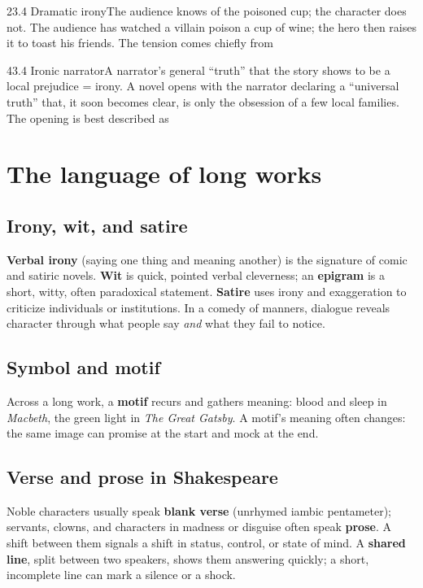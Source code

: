 \documentclass[11pt]{article}
\begin{document}
\begin{q}{2}{3.4 Dramatic irony}{The audience knows of the poisoned cup; the character does not.}
The audience has watched a villain poison a cup of wine; the hero then raises it to toast his friends. The tension comes chiefly from
\end{q}

\begin{q}{4}{3.4 Ironic narrator}{A narrator's general ``truth'' that the story shows to be a local prejudice = irony.}
A novel opens with the narrator declaring a ``universal truth'' that, it soon becomes clear, is only the obsession of a few local families. The opening is best described as
\end{q}

\section{The language of long works}
\label{sec:5}

\subsection{Irony, wit, and satire}
\textbf{Verbal irony} (saying one thing and meaning another) is the signature of comic and satiric novels. \textbf{Wit} is quick, pointed verbal cleverness; an \textbf{epigram} is a short, witty, often paradoxical statement. \textbf{Satire} uses irony and exaggeration to criticize individuals or institutions. In a comedy of manners, dialogue reveals character through what people say \emph{and} what they fail to notice.

\subsection{Symbol and motif}
Across a long work, a \textbf{motif} recurs and gathers meaning: blood and sleep in \emph{Macbeth}, the green light in \emph{The Great Gatsby}. A motif's meaning often changes: the same image can promise at the start and mock at the end.

\subsection{Verse and prose in Shakespeare}
Noble characters usually speak \textbf{blank verse} (unrhymed iambic pentameter); servants, clowns, and characters in madness or disguise often speak \textbf{prose}. A shift between them signals a shift in status, control, or state of mind. A \textbf{shared line}, split between two speakers, shows them answering quickly; a short, incomplete line can mark a silence or a shock.
\end{document}
